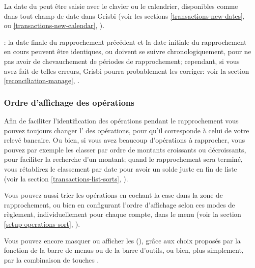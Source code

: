 La date du  peut être saisie avec le clavier ou le calendrier, disponibles comme dans tout champ de date dans Grisbi (voir les sections \vref{transactions-new-dates},  ou \vref{transactions-new-calendar}, ).

\Attention{}: la date finale du rapprochement précédent et la date initiale du rapprochement en cours peuvent être identiques, ou doivent se suivre chronologiquement, pour ne pas avoir de chevauchement de périodes de rapprochement; cependant, si vous avez fait de telles erreurs, Grisbi pourra probablement les corriger: voir la section \vref{reconciliation-manage}, .


\subsubsection{Ordre d'affichage des opérations\label{reconciliation-account-description-sort}}

Afin de faciliter l'identification des opérations pendant le rapprochement vous pouvez toujours changer l' des opérations, pour qu'il corresponde à celui de votre relevé bancaire. Ou bien, si vous avez beaucoup d'opérations à rapprocher, vous pouvez par exemple les classer par ordre de montants croissants ou décroissants, pour faciliter la recherche d'un montant; quand le rapprochement sera terminé, vous rétablirez le classement par date pour avoir un solde juste en fin de liste (voir la section \vref{transactions-list-sorts}, ).

Vous pouvez aussi trier les opérations en cochant la case  dans la zone de rapprochement, ou bien en configurant l'ordre d'affichage selon ces modes de règlement, individuellement pour chaque compte, dans le menu  (voir la section \vref{setup-operations-sort}, ).

Vous pouvez encore masquer ou afficher les  (), grâce aux choix proposés par la fonction  de la barre de menus ou de la barre d'outils, ou bien, plus simplement, par la combinaison de touches .


